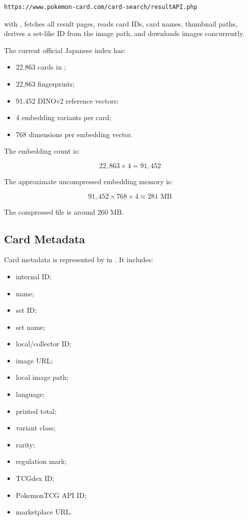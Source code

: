 \documentclass[11pt,a4paper]{article}
\begin{document}
\begin{lstlisting}
https://www.pokemon-card.com/card-search/resultAPI.php
\end{lstlisting}

with , fetches all result pages, reads card IDs, card names, thumbnail paths, derives a set-like ID from the image path, and downloads images concurrently.

The current official Japanese index has:

\begin{itemize}
  \item 22,863 cards in ;
  \item 22,863 fingerprints;
  \item 91,452 DINOv2 reference vectors;
  \item 4 embedding variants per card;
  \item 768 dimensions per embedding vector.
\end{itemize}

The embedding count is:

\[
22{,}863 \times 4 = 91{,}452
\]

The approximate uncompressed embedding memory is:

\[
91{,}452 \times 768 \times 4 \approx 281\text{ MB}
\]

The compressed  file is around 260 MB.

\subsection{Card Metadata}

Card metadata is represented by  in . It includes:

\begin{itemize}
  \item internal ID;
  \item name;
  \item set ID;
  \item set name;
  \item local/collector ID;
  \item image URL;
  \item local image path;
  \item language;
  \item printed total;
  \item variant class;
  \item rarity;
  \item regulation mark;
  \item TCGdex ID;
  \item PokemonTCG API ID;
  \item marketplace URL.
\end{itemize}
\end{document}
